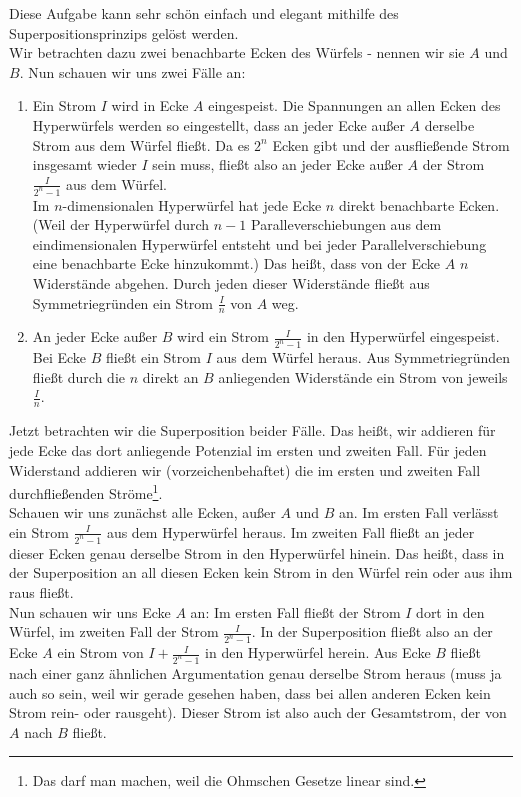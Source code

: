 \begin{Answer}[ref = hypercube]
	Diese Aufgabe kann sehr schön einfach und elegant mithilfe des Superpositionsprinzips gelöst werden.\\
	Wir betrachten dazu zwei benachbarte Ecken des Würfels - nennen wir sie $A$ und $B$. Nun schauen wir uns zwei Fälle an:
	\begin{enumerate}
	\item Ein Strom $I$ wird in Ecke $A$ eingespeist. Die Spannungen an allen Ecken des Hyperwürfels werden so eingestellt, 	dass an jeder Ecke außer $A$ derselbe Strom aus dem Würfel fließt. Da es $2^n$ Ecken gibt und der ausfließende Strom 		insgesamt wieder $I$ sein muss, fließt also an jeder Ecke außer $A$ der Strom $\frac{I}{2^n-1}$ aus dem Würfel.\\
	Im $n$-dimensionalen Hyperwürfel hat jede Ecke $n$ direkt benachbarte Ecken. (Weil der Hyperwürfel durch $n-1$ 			Paralleverschiebungen aus dem eindimensionalen Hyperwürfel entsteht und bei jeder Parallelverschiebung eine benachbarte 	Ecke hinzukommt.) Das heißt, dass von der Ecke $A$ $n$ Widerstände abgehen. Durch jeden dieser Widerstände fließt aus 		Symmetriegründen ein Strom $\frac{I}{n}$ von $A$ weg.
	\item An jeder Ecke außer $B$ wird ein Strom $\frac{I}{2^n-1}$ in den Hyperwürfel eingespeist. Bei Ecke $B$ fließt ein 		Strom $I$ aus dem Würfel heraus. Aus Symmetriegründen fließt durch die $n$ direkt an $B$ anliegenden Widerstände ein Strom 	   von jeweils $\frac{I}{n}$.  
	\end{enumerate}
	Jetzt betrachten wir die Superposition beider Fälle. Das heißt, wir addieren für jede Ecke das dort anliegende Potenzial im 	    ersten und zweiten Fall. Für jeden Widerstand addieren wir (vorzeichenbehaftet) die im ersten und zweiten Fall 		durchfließenden Ströme\footnote{Das darf man machen, weil die Ohmschen Gesetze linear sind.}.\\
	Schauen wir uns zunächst alle Ecken, außer $A$ und $B$ an. Im ersten Fall verlässt ein Strom $\frac{I}{2^n-1}$ aus dem 		Hyperwürfel heraus. Im zweiten Fall fließt an jeder dieser Ecken genau derselbe Strom in den Hyperwürfel hinein. Das heißt, 	    dass in der Superposition an all diesen Ecken kein Strom in den Würfel rein oder aus ihm raus fließt.\\
	Nun schauen wir uns Ecke $A$ an: Im ersten Fall fließt der Strom $I$ dort in den Würfel, im zweiten Fall der Strom 		$\frac{I}{2^n-1}$. In der Superposition fließt also an der Ecke $A$ ein Strom von $I+\frac{I}{2^n-1}$    	       in den Hyperwürfel herein. Aus Ecke $B$ fließt nach einer ganz ähnlichen Argumentation genau derselbe Strom heraus (muss ja auch so sein, weil wir gerade gesehen haben, dass bei allen anderen Ecken kein Strom rein- oder rausgeht). Dieser Strom ist also auch der Gesamtstrom, der von $A$ nach $B$ fließt.\\

\end{Answer}
